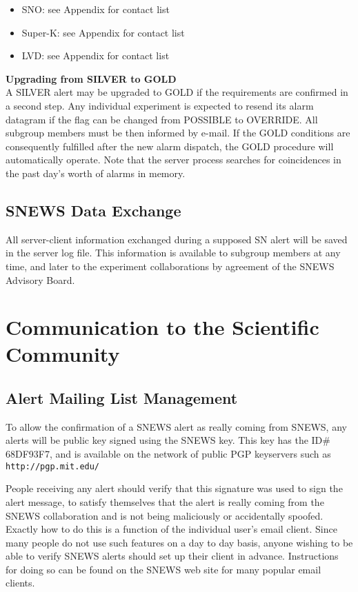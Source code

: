 \documentclass{article}
\begin{document}
\begin{itemize}

\item SNO: see Appendix for contact list
\item Super-K: see Appendix for contact list
\item LVD: see Appendix for contact list

\end{itemize}


\noindent \textbf{Upgrading from SILVER to GOLD}\\
A SILVER alert may be upgraded to GOLD if the requirements are
confirmed in a second step. Any individual experiment is expected to
resend its alarm datagram if the flag can be changed from POSSIBLE to
OVERRIDE. All subgroup members must be then informed by
e-mail. If the GOLD conditions are consequently fulfilled after the
new alarm dispatch, the GOLD procedure will automatically operate.
Note that the server process searches for coincidences
in the past day's worth of alarms in memory.

\subsection{SNEWS Data Exchange}

All server-client information
exchanged during a supposed SN alert will be saved
in the server log file. This information is available to subgroup
members at any time, and later to the experiment collaborations
by agreement of the SNEWS Advisory Board.



\section{Communication to the Scientific Community}

\subsection{Alert Mailing List Management}

To allow the confirmation of a SNEWS alert as really coming from SNEWS,
any alerts will be public key signed using the SNEWS key.  This key has
the ID\# 68DF93F7, and is available on the network of public PGP
keyservers such as \texttt{http://pgp.mit.edu/}

People receiving any alert should verify that this signature was used to
sign the alert message, to satisfy themselves that the alert is really
coming from the SNEWS collaboration and is not being maliciously or
accidentally spoofed.  Exactly how to do this is a function of the
individual user's email client.  Since many people do not use such
features on a day to day basis, anyone wishing to be able to verify
SNEWS alerts should set up their client in advance.  Instructions for
doing so can be found on the SNEWS web site for many popular email
clients.  
\end{document}
